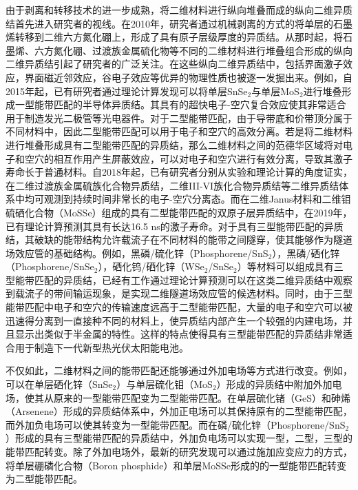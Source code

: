     由于剥离和转移技术的进一步成熟，将二维材料进行纵向堆叠而成的纵向二维异质结首先进入研究者的视线。在2010年，研究者通过机械剥离的方式的将单层的石墨烯转移到二维六方氮化硼上，形成了具有原子层级厚度的异质结。从那时起，将石墨烯、六方氮化硼、过渡族金属硫化物等不同的二维材料进行堆叠组合形成的纵向二维异质结引起了研究者的广泛关注。在这些纵向二维异质结中，包括界面激子效应，界面磁近邻效应，谷电子效应等优异的物理性质也被逐一发掘出来。例如，自2015年起，已有研究者通过理论计算发现可以将单层SnSe$_2$与单层MoS$_2$进行堆叠形成一型能带匹配的半导体异质结。其具有的超快电子-空穴复合效应使其非常适合用于制造发光二极管等光电器件。对于二型能带匹配，由于导带底和价带顶分属于不同材料中，因此二型能带匹配可以用于电子和空穴的高效分离。若是将二维材料进行堆叠形成具有二型能带匹配的异质结，那么二维材料之间的范德华区域将对电子和空穴的相互作用产生屏蔽效应，可以对电子和空穴进行有效分离，导致其激子寿命长于普通材料。自2018年起，已有研究者分别从实验和理论计算的角度证实，在二维过渡族金属硫族化合物异质结，二维III-VI族化合物异质结等二维异质结体系中均可观测到持续时间非常长的电子-空穴分离态。而在二维Janus材料和二维钼硫硒化合物（MoSSe）组成的具有二型能带匹配的双原子层异质结中，在2019年，已有理论计算预测其具有长达16.5 ns的激子寿命。对于具有三型能带匹配的异质结，其破缺的能带结构允许载流子在不同材料的能带之间隧穿，使其能够作为隧道场效应管的基础结构。例如，黑磷/硫化锌（Phosphorene/SnS$_2$），黑磷/硒化锌（Phosphorene/SnSe$_2$），硒化钨/硒化锌（WSe$_2$/SnSe$_2$）等材料可以组成具有三型能带匹配的异质结，已经有工作通过理论计算预测可以在这类二维异质结中观察到载流子的带间输运现象，是实现二维隧道场效应管的候选材料。同时，由于三型能带匹配中电子和空穴的传输速度远高于二型能带匹配，大量的电子和空穴可以被迅速得分离到一直接种不同的材料上，使异质结内部产生一个较强的内建电场，并且显示出类似于半金属的特性。这样的特点使得具有三型能带匹配的异质结非常适合用于制造下一代新型热光伏太阳能电池。

    不仅如此，二维材料之间的能带匹配还能够通过外加电场等方式进行改变。例如，可以在单层硒化锌（SnSe$_2$）与单层硫化钼（MoS$_2$）形成的异质结中附加外加电场，使其从原来的一型能带匹配变为二型能带匹配。在单层硫化锗（GeS）和砷烯（Arsenene）形成的异质结体系中，外加正电场可以其保持原有的二型能带匹配，而外加负电场可以使其转变为一型能带匹配。而在磷/硫化锌（Phosphorene/SnS$_2$）形成的具有三型能带匹配的异质结中，外加负电场可以实现一型，二型，三型的能带匹配转变。除了外加电场外，最新的研究发现可以通过施加应变应力的方式，将单层硼磷化合物（Boron phosphide）和单层MoSSe形成的的一型能带匹配转变为二型能带匹配。

